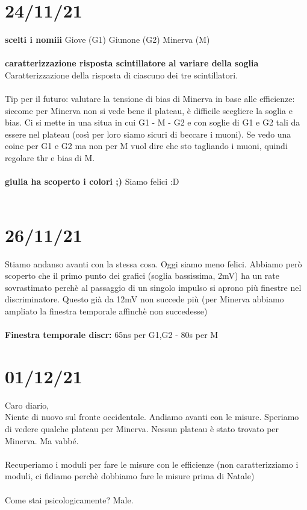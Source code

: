 \documentclass{article}
\begin{document}
\section{24/11/21}
\textbf{scelti i nomiii}
Giove (G1)
Giunone (G2)
Minerva (M)\\\\
\textbf{caratterizzazione risposta scintillatore al variare della soglia}\\
Caratterizzazione della risposta di ciascuno dei tre scintillatori.\\\\
Tip per il futuro: valutare la tensione di bias di Minerva in base alle efficienze: siccome per Minerva non si vede bene il plateau, è difficile scegliere la soglia e bias. Ci si mette in una situa in cui G1 - M - G2 e con soglie di G1 e G2 tali da essere nel plateau (così per loro siamo sicuri di beccare i muoni). Se vedo una coinc per G1 e G2 ma non per M vuol dire che sto tagliando i muoni, quindi regolare thr e bias di M.\\\\
\textbf{giulia ha scoperto i colori ;)}
Siamo felici :D \\\\


\section{26/11/21}
Stiamo andanso avanti con la stessa cosa. Oggi siamo meno felici. Abbiamo però scoperto che il primo punto dei grafici (soglia bassissima, 2mV) ha un rate sovrastimato perchè al passaggio di un singolo impulso si aprono più finestre nel discriminatore. Questo già da 12mV non succede più (per Minerva abbiamo ampliato la finestra temporale affinchè non succedesse)\\\\
\textbf{Finestra temporale discr:} 65ns per G1,G2 - 80s per M

\section{01/12/21}
Caro diario,\\
Niente di nuovo sul fronte occidentale. Andiamo avanti con le misure. Speriamo di vedere qualche plateau per Minerva. Nessun plateau è stato trovato per Minerva. Ma vabbé.\\\\
Recuperiamo i moduli per fare le misure con le efficienze (non caratterizziamo i moduli, ci fidiamo perchè dobbiamo fare le misure prima di Natale)\\\\
Come stai psicologicamente? Male.
\end{document}
